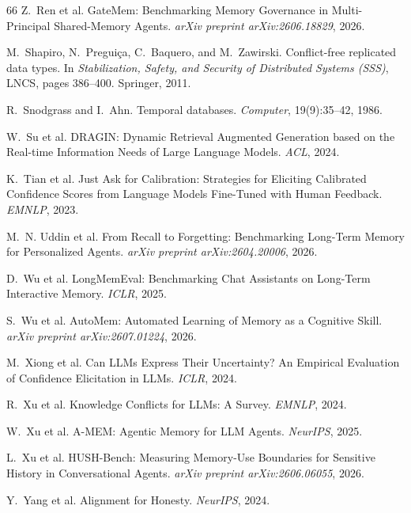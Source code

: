 \documentclass{article}
\begin{document}
\begin{thebibliography}{66}
Z.~Ren et al. GateMem: Benchmarking Memory Governance in Multi-Principal Shared-Memory Agents. \emph{arXiv preprint arXiv:2606.18829}, 2026.

M.~Shapiro, N.~Pregui\c{c}a, C.~Baquero, and M.~Zawirski. Conflict-free replicated data types. In \emph{Stabilization, Safety, and Security of Distributed Systems (SSS)}, LNCS, pages 386--400. Springer, 2011.

R.~Snodgrass and I.~Ahn. Temporal databases. \emph{Computer}, 19(9):35--42, 1986.

W.~Su et al. DRAGIN: Dynamic Retrieval Augmented Generation based on the Real-time Information Needs of Large Language Models. \emph{ACL}, 2024.

K.~Tian et al. Just Ask for Calibration: Strategies for Eliciting Calibrated Confidence Scores from Language Models Fine-Tuned with Human Feedback. \emph{EMNLP}, 2023.

M.~N. Uddin et al. From Recall to Forgetting: Benchmarking Long-Term Memory for Personalized Agents. \emph{arXiv preprint arXiv:2604.20006}, 2026.

D.~Wu et al. LongMemEval: Benchmarking Chat Assistants on Long-Term Interactive Memory. \emph{ICLR}, 2025.

S.~Wu et al. AutoMem: Automated Learning of Memory as a Cognitive Skill. \emph{arXiv preprint arXiv:2607.01224}, 2026.

M.~Xiong et al. Can LLMs Express Their Uncertainty? An Empirical Evaluation of Confidence Elicitation in LLMs. \emph{ICLR}, 2024.

R.~Xu et al. Knowledge Conflicts for LLMs: A Survey. \emph{EMNLP}, 2024.

W.~Xu et al. A-MEM: Agentic Memory for LLM Agents. \emph{NeurIPS}, 2025.

L.~Xu et al. HUSH-Bench: Measuring Memory-Use Boundaries for Sensitive History in Conversational Agents. \emph{arXiv preprint arXiv:2606.06055}, 2026.

Y.~Yang et al. Alignment for Honesty. \emph{NeurIPS}, 2024.


\end{thebibliography}
\end{document}
